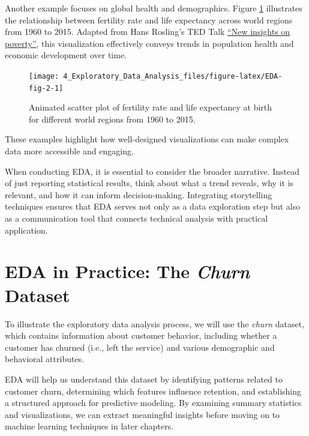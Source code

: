 \documentclass[
  11pt,
]{book}
\theoremstyle{definition}
\theoremstyle{definition}
\theoremstyle{definition}
\theoremstyle{definition}
\theoremstyle{remark}
\begin{document}
Another example focuses on global health and demographics. Figure \ref{fig:EDA-fig-2} illustrates the relationship between fertility rate and life expectancy across world regions from 1960 to 2015. Adapted from Hans Rosling's TED Talk \href{https://www.ted.com/talks/hans_rosling_new_insights_on_poverty}{``New insights on poverty''}, this visualization effectively conveys trends in population health and economic development over time.

\begin{figure}[H]

{\centering \texttt{[image: 4\_Exploratory\_Data\_Analysis\_files/figure-latex/EDA-fig-2-1]} 

}

\caption{Animated scatter plot of fertility rate and life expectancy at birth for different world regions from 1960 to 2015.}\label{fig:EDA-fig-2}
\end{figure}

These examples highlight how well-designed visualizations can make complex data more accessible and engaging.

When conducting EDA, it is essential to consider the broader narrative. Instead of just reporting statistical results, think about what a trend reveals, why it is relevant, and how it can inform decision-making. Integrating storytelling techniques ensures that EDA serves not only as a data exploration step but also as a communication tool that connects technical analysis with practical application.

\section{\texorpdfstring{EDA in Practice: The \emph{Churn} Dataset}{EDA in Practice: The Churn Dataset}}\label{EDA-sec-churn}

To illustrate the exploratory data analysis process, we will use the \emph{churn} dataset, which contains information about customer behavior, including whether a customer has churned (i.e., left the service) and various demographic and behavioral attributes.

EDA will help us understand this dataset by identifying patterns related to customer churn, determining which features influence retention, and establishing a structured approach for predictive modeling. By examining summary statistics and visualizations, we can extract meaningful insights before moving on to machine learning techniques in later chapters.
\end{document}
